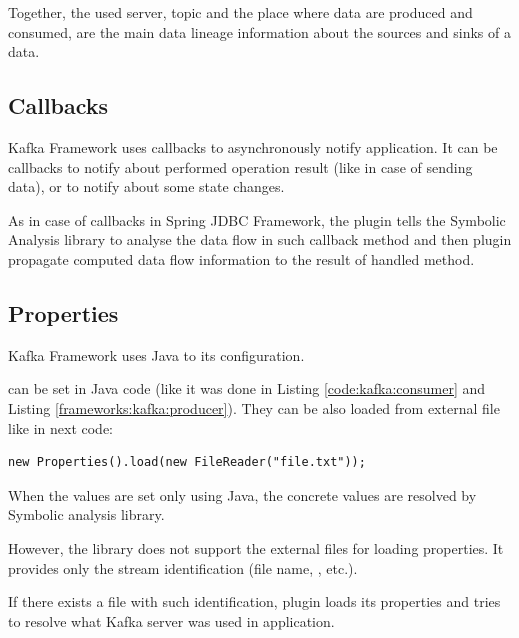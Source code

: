 Together, the used server, topic and the place where data are produced and consumed,
are the main data lineage information about the sources and sinks of a data.




\subsection{Callbacks}

Kafka Framework uses callbacks to asynchronously notify application.
It can be callbacks to notify about performed operation result (like in case of sending data),
or to notify about some state changes.

As in case of callbacks in Spring JDBC Framework, the plugin tells
the Symbolic Analysis library to analyse the data flow in such callback method
and then plugin propagate computed data flow information 
to the result of handled method.




\subsection{Properties}

Kafka Framework uses Java  to its configuration.

 can be set in Java code (like it was done in
Listing \ref{code:kafka:consumer} and Listing \ref{frameworks:kafka:producer}).
They can be also loaded from external file like in next code:
\begin{lstlisting}[language=JavaSnippet]
        new Properties().load(new FileReader("file.txt"));
\end{lstlisting}

When the  values are set only using Java, the concrete
values are resolved by Symbolic analysis library.

However, the library does not support the external files for loading properties.
It provides only the stream identification (file name, , etc.).

If there exists a file with such identification, plugin loads its properties and
tries to resolve what Kafka server was used in application.


